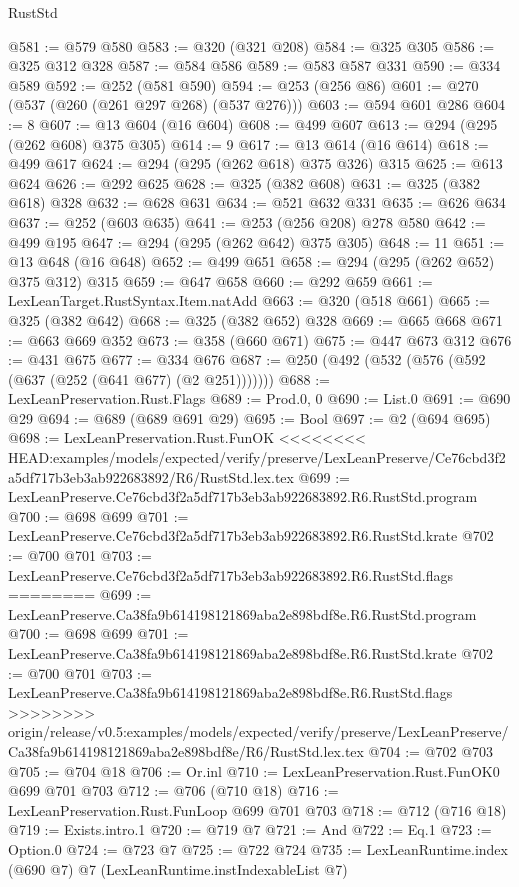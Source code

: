 \begin{lexlean}{RustStd}
\begin{coremodule}
{\begin{coremodule}
{{{{{{{{{{@581 := @579 @580
@583 := @320 (@321 @208)
@584 := @325 @305
@586 := @325 @312 @328
@587 := @584 @586
@589 := @583 @587 @331
@590 := @334 @589
@592 := @252 (@581 @590)
@594 := @253 (@256 @86)
@601 := @270 (@537 (@260 (@261 @297 @268) (@537 @276)))
@603 := @594 @601 @286
@604 := 8
@607 := @13 @604 (@16 @604)
@608 := @499 @607
@613 := @294 (@295 (@262 @608) @375 @305)
@614 := 9
@617 := @13 @614 (@16 @614)
@618 := @499 @617
@624 := @294 (@295 (@262 @618) @375 @326) @315
@625 := @613 @624
@626 := @292 @625
@628 := @325 (@382 @608)
@631 := @325 (@382 @618) @328
@632 := @628 @631
@634 := @521 @632 @331
@635 := @626 @634
@637 := @252 (@603 @635)
@641 := @253 (@256 @208) @278 @580
@642 := @499 @195
@647 := @294 (@295 (@262 @642) @375 @305)
@648 := 11
@651 := @13 @648 (@16 @648)
@652 := @499 @651
@658 := @294 (@295 (@262 @652) @375 @312) @315
@659 := @647 @658
@660 := @292 @659
@661 := LexLeanTarget.RustSyntax.Item.natAdd
@663 := @320 (@518 @661)
@665 := @325 (@382 @642)
@668 := @325 (@382 @652) @328
@669 := @665 @668
@671 := @663 @669 @352
@673 := @358 (@660 @671)
@675 := @447 @673 @312
@676 := @431 @675
@677 := @334 @676
@687 := @250 (@492 (@532 (@576 (@592 (@637 (@252 (@641 @677) (@2 @251)))))))
@688 := LexLeanPreservation.Rust.Flags
@689 := Prod.{0, 0}
@690 := List.{0}
@691 := @690 @29
@694 := @689 (@689 @691 @29)
@695 := Bool
@697 := @2 (@694 @695)
@698 := LexLeanPreservation.Rust.FunOK
<<<<<<<< HEAD:examples/models/expected/verify/preserve/LexLeanPreserve/Ce76cbd3f2a5df717b3eb3ab922683892/R6/RustStd.lex.tex
@699 := LexLeanPreserve.Ce76cbd3f2a5df717b3eb3ab922683892.R6.RustStd.program
@700 := @698 @699
@701 := LexLeanPreserve.Ce76cbd3f2a5df717b3eb3ab922683892.R6.RustStd.krate
@702 := @700 @701
@703 := LexLeanPreserve.Ce76cbd3f2a5df717b3eb3ab922683892.R6.RustStd.flags
========
@699 := LexLeanPreserve.Ca38fa9b614198121869aba2e898bdf8e.R6.RustStd.program
@700 := @698 @699
@701 := LexLeanPreserve.Ca38fa9b614198121869aba2e898bdf8e.R6.RustStd.krate
@702 := @700 @701
@703 := LexLeanPreserve.Ca38fa9b614198121869aba2e898bdf8e.R6.RustStd.flags
>>>>>>>> origin/release/v0.5:examples/models/expected/verify/preserve/LexLeanPreserve/Ca38fa9b614198121869aba2e898bdf8e/R6/RustStd.lex.tex
@704 := @702 @703
@705 := @704 @18
@706 := Or.inl
@710 := LexLeanPreservation.Rust.FunOK0 @699 @701 @703
@712 := @706 (@710 @18)
@716 := LexLeanPreservation.Rust.FunLoop @699 @701 @703
@718 := @712 (@716 @18)
@719 := Exists.intro.{1}
@720 := @719 @7
@721 := And
@722 := Eq.{1}
@723 := Option.{0}
@724 := @723 @7
@725 := @722 @724
@735 := LexLeanRuntime.index
    (@690 @7)
    @7
    (LexLeanRuntime.instIndexableList @7)
}}}}}}}}}}
\end{coremodule}}
\end{coremodule}
\end{lexlean}
